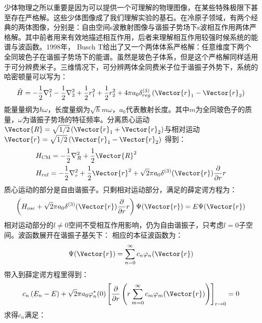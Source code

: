 少体物理之所以重要是因为可以提供一个可理解的物理图像，在某些特殊极限下甚至存在严格解。这些少体图像成了我们理解实验的基石。在冷原子领域，有两个经典的两体图像，分别是：自由空间s波散射图像与谐振子势场下s波相互作用两体严格解。其中前者用来有效地描述相互作用，后者来理解相互作用较强时候系统的能谱与波函数。1998年， Busch T给出了又一个两体体系严格解\cite{busch1998two}：任意维度下两个全同玻色子在谐振子势场下的能谱。虽然是玻色子体系，但是这个严格解同样适用于可分辨费米子。三维情况下，可分辨两体全同费米子位于谐振子外势下，系统的哈密顿量可以写为：
\begin{equation}
\hat{H}=-\frac{1}{2} \nabla_{1}^{2}-\frac{1}{2} \nabla_{2}^{2}+\frac{1}{2} r_{1}^{2}+\frac{1}{2} r_{2}^{2}+4 \pi a_{0} \delta_{r e g}^{(3)}\left(\Vector{r}_{1}-\Vector{r}_{2}\right)
\end{equation}
能量量纲为$\hbar\omega$，长度量纲为$\sqrt{\hbar}{m\omega}$，$a_0$代表散射长度。其中$m$为全同玻色子的质量，$\omega$为谐振子势场的特征频率。分离质心运动$\Vector{R}=\sqrt{1 / 2}\left(\Vector{r}_{1}+\Vector{r}_{2}\right)$与相对运动$\Vector{r}=\sqrt{1 / 2}\left(\Vector{r}_{1}-\Vector{r}_{2}\right)$
得到：
\begin{equation}
\begin{aligned}
&H_{\mathrm{CM}}=-\frac{1}{2} \nabla_{R}^{2}+\frac{1}{2} \Vector{R}^{2}\\
&H_{r e l}=-\frac{1}{2} \nabla_{r}^{2}+\frac{1}{2} \Vector{r}^{2}+\sqrt{2} \pi a_{0} \delta^{(3)}(\Vector{r}) \frac{\partial}{\partial r} r\\
\end{aligned}
\end{equation}
质心运动的部分是自由谐振子。只剩相对运动部分，满足的薛定谔方程为：
\begin{equation}
\left(H_{o s c}+\sqrt{2} \pi a_{0} \delta^{(3)}(\Vector{r}) \frac{\partial}{\partial r} r\right) \Psi(\Vector{r})=E \Psi(\Vector{r})
\end{equation}
相对运动部分的$l\neq0$空间不受相互作用影响，仍为自由谐振子，只考虑$l=0$子空间。波函数展开在谐振子基矢下：
相应的本征波函数为：
\begin{equation}
\Psi(\Vector{r})=\sum_{n=0}^{\infty} c_{n} \varphi_{n}(\Vector{r})
\end{equation}
带入到薛定谔方程里得到：
\begin{equation}
c_{n}\left(E_{n}-E\right)+\sqrt{2} \pi a_{0} \varphi_{n}^{*}(0)\left[\frac{\partial}{\partial r}\left(r \sum_{m=0}^{\infty} c_{m} \varphi_{m}(\Vector{r})\right)\right]_{r \rightarrow 0}=0
\end{equation}
求得$c_n$满足：
